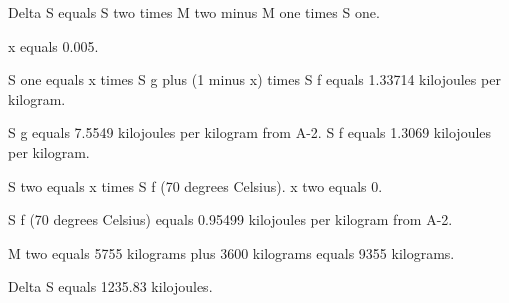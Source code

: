 Delta S equals S two times M two minus M one times S one.  

x equals 0.005.  

S one equals x times S g plus (1 minus x) times S f equals 1.33714 kilojoules per kilogram.  

S g equals 7.5549 kilojoules per kilogram from A-2.  
S f equals 1.3069 kilojoules per kilogram.  

S two equals x times S f (70 degrees Celsius).  
x two equals 0.  

S f (70 degrees Celsius) equals 0.95499 kilojoules per kilogram from A-2.  

M two equals 5755 kilograms plus 3600 kilograms equals 9355 kilograms.  

Delta S equals 1235.83 kilojoules.